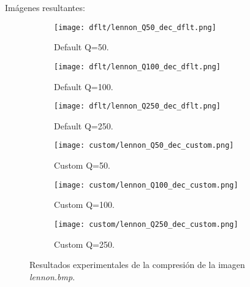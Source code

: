 \documentclass[12pt,a4paper]{article}
\begin{document}
Imágenes resultantes:
\begin{figure}   [H]   
    \begin{subfigure}{0.30\textwidth}
        \centering
        \texttt{[image: dflt/lennon\_Q50\_dec\_dflt.png]}
        \caption{Default Q=50.}
        
    \end{subfigure}
    \hfill
    \begin{subfigure}{0.30\textwidth}
        \centering
        \texttt{[image: dflt/lennon\_Q100\_dec\_dflt.png]}
        \caption{Default Q=100.}
        
    \end{subfigure}
    \hfill
    \begin{subfigure}{0.30\textwidth}
        \centering
        \texttt{[image: dflt/lennon\_Q250\_dec\_dflt.png]}
        \caption{Default Q=250.}
        
    \end{subfigure}
    
    \vspace{0.5cm}
    
    \begin{subfigure}{0.30\textwidth}
        \centering
        \texttt{[image: custom/lennon\_Q50\_dec\_custom.png]}
        \caption{Custom Q=50.}
        
    \end{subfigure}
    \hfill
    \begin{subfigure}{0.30\textwidth}
        \centering
        \texttt{[image: custom/lennon\_Q100\_dec\_custom.png]}
        \caption{Custom Q=100.}
        
    \end{subfigure}
    \hfill
    \begin{subfigure}{0.30\textwidth}
        \centering
        \texttt{[image: custom/lennon\_Q250\_dec\_custom.png]}
        \caption{Custom Q=250.}
        
    \end{subfigure}
    
    \caption[Resultados experimentales - lennon]{Resultados experimentales de la compresión de la imagen \textit{lennon.bmp}.}
    
\end{figure}
\end{document}
